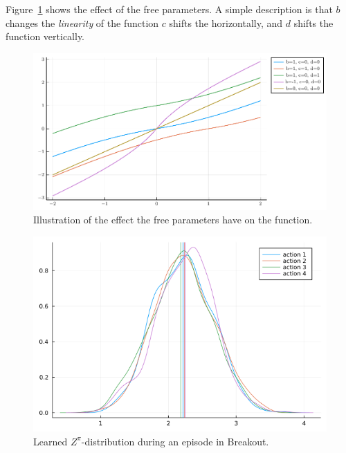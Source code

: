 \documentclass[twoside]{article}
\begin{document}
Figure~\ref{fig:luddeflow} shows the effect of the free parameters. A simple
description is that \(b\) changes the
\emph{linearity} of the function \(c\) shifts the horizontally, and
\(d\) shifts the function vertically.

\begin{figure}[ht]
  \vspace{.3in}
  \includegraphics[width=\columnwidth]{new_flow.pdf}
  \vspace{.3in}
  \caption{Illustration of the effect the free parameters have on the function.
  }\label{fig:luddeflow}
\end{figure}

\begin{figure}[ht]
  \vspace{.3in}
  \includegraphics[width=\columnwidth]{qdistr_6100.png}
  \vspace{.3in}
  \caption{Learned \(Z^\pi\)-distribution during an episode in Breakout.}
\end{figure}
\end{document}
